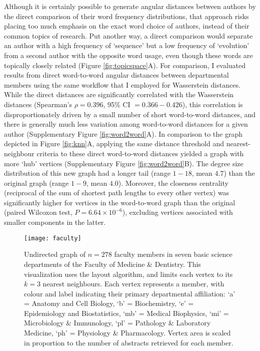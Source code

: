 \documentclass[12pt]{article}
\begin{document}


Although it is certainly possible to generate angular distances between authors by the direct comparison of their word frequency distributions, that approach risks placing too much emphasis on the exact word choice of authors, instead of their common topics of research.
Put another way, a direct comparison would separate an author with a high frequency of `sequence' but a low frequency of `evolution' from a second author with the opposite word usage, even though these words are topically closely related (Figure \ref{fig:topicspace}A).
For comparison, I evaluated results from direct word-to-word angular distances between departmental members using the same workflow that I employed for Wasserstein distances.
While the direct distances are significantly correlated with the Wasserstein distances (Spearman's $\rho=0.396$, 95\% CI $=0.366-0.426$), this correlation is disproportionately driven by a small number of short word-to-word distances, and there is generally much less variation among word-to-word distances for a given author (Supplementary Figure \ref{fig:word2word}A).
In comparison to the graph depicted in Figure \ref{fig:knn}A, applying the same distance threshold and nearest-neighbour criteria to these direct word-to-word distances yielded a graph with more `hub' vertices (Supplementary Figure \ref{fig:word2word}B).
The degree size distribution of this new graph had a longer tail (range $1-18$, mean $4.7$) than the original graph (range $1-9$, mean $4.0$).
Moreover, the closeness centrality (reciprocal of the sum of shortest path lengths to every other vertex) was significantly higher for vertices in the word-to-word graph than the original (paired Wilcoxon test, $P=6.64\times 10^{-6}$), excluding vertices associated with smaller components in the latter.



\begin{figure}[tbp]
\centering
\texttt{[image: faculty]}
\caption{
Undirected graph of $n=278$ faculty members in seven basic science departments of the Faculty of Medicine \& Dentistry.
This visualization uses the \cite{kamada1989algorithm} layout algorithm, and limits each vertex to its $k=3$ nearest neighbours.
Each vertex represents a member, with colour and label indicating their primary departmental affiliation: `a' = Anatomy and Cell Biology, `b' = Biochemistry, `e' = Epidemiology and Biostatistics, `mb' = Medical Biophysics, `mi' = Microbiology \& Immunology, `pl' = Pathology \& Laboratory Medicine, `ph' = Physiology \& Pharmacology.
Vertex area is scaled in proportion to the number of abstracts retrieved for each member.
}
\label{fig:faculty}
\end{figure}
\end{document}
